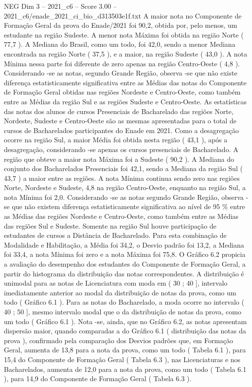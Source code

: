 \begin{textsample}{NEG Dim 3 – 2021\_c6 – Score 3.00 – 2021\_c6/enade\_2021\_ci\_bio\_d313503e1f.txt}
A maior nota no Componente de Formação Geral da prova do Enade/2021 foi 90,2, obtida por, pelo menos, um estudante na região Sudeste.
A menor nota Máxima foi obtida na região Norte ( 77,7 ).
A Mediana do Brasil, como um todo, foi 42,0, sendo a menor Mediana encontrada na região Norte ( 37,5 ), e a maior, na região Sudeste ( 43,0 ).
A nota Mínima nessa parte foi diferente de zero apenas na região Centro-Oeste ( 4,8 ).
Considerando -se as notas, segundo Grande Região, observa -se que não existe diferença estatisticamente significativa entre as Médias das notas do Componente de Formação Geral obtidas nas regiões Nordeste e Centro-Oeste, como também entre as Médias da região Sul e as regiões Sudeste e Centro-Oeste.
As estatísticas das notas dos alunos de cursos Presenciais de Bacharelado das regiões Norte, Nordeste, Sudeste e Centro-Oeste são as mesmas apresentadas para o total de cursos de Bacharelados participantes do Enade em 2021.
Como a desagregação ocorre na região Sul, a maior Média foi obtida nesta região ( 43,1 ), após a desagregação, considerando -se apenas os cursos presenciais de Bacharelado.
A região que obteve a maior nota Máxima foi a Sudeste ( 90,2 ).
A Mediana do conjunto dos Bacharelados Presenciais foi 42,1, sendo a Mediana da região Sul ( 43,7 ) a maior entre as regiões.
A nota Mínima continua sendo zero nas regiões Norte, Nordeste e Sudeste, 4,8 na região Centro-Oeste, enquanto na região Sul, a nota Mínima foi 2,0.
Considerando -se as notas segundo Grande Região, observa -se que não existem diferença estatisticamente significativa ao nível de 95 \% entre as Médias das regiões Nordeste e Centro-Oeste, como também entre as Médias das regiões Sul e Sudeste.
Somente na região Sul houve participação de estudantes de cursos a Distância de Bacharelado.
Para esta combinação de Modalidade e Habilitação, a Média foi 34,2, o Desvio padrão foi 13,2, a Mediana foi 33,4, a nota Mínima foi zero e a nota Máxima foi 75,8.
O Gráfico 6.2 propicia a avaliação do desempenho dos estudantes do Componente de Formação Geral, a partir do histograma da distribuição das notas correspondentes.
A distribuição é unimodal para as notas de Licenciatura com moda em ( 30 ; 40 ], intervalo imediatamente anterior ao modal da distribuição de notas da prova, como um todo ( Gráfico 6.1 ).
Para as notas do Bacharelado, a moda ocorre no intervalo ( 40 ; 50 ], mesmo intervalo modal que o da distribuição de notas da prova, como um todo ( Gráfico 6.1 ).
Nota -se, ainda, que no Gráfico 6.2, as notas apresentam dispersão maior, quando comparadas a do Gráfico 6.1 ( distribuição das notas da prova ), confirmado pela comparação dos Desvios padrões que, em Formação Geral, aumenta de 13,8 para a nota da prova, como um todo ( Tabela 6.1 ), para 15,4 do Componente de Formação Geral ( Tabela 6.3 ), nas Licenciaturas e nos Bacharelados, aumenta de 12,0 para a nota da prova, como um todo ( Tabela 6.1 ), para 14,9 do Componente de Formação Geral ( Tabela 6.3 ).

\end{textsample}
